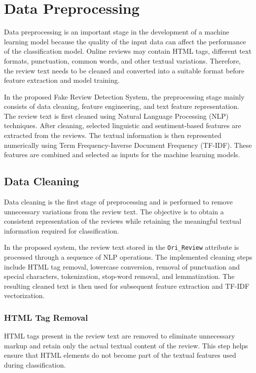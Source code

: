 \documentclass[12pt,a4paper]{report}
\begin{document}
\section{Data Preprocessing}

Data preprocessing is an important stage in the development of a machine learning model because the quality of the input data can affect the performance of the classification model. Online reviews may contain HTML tags, different text formats, punctuation, common words, and other textual variations. Therefore, the review text needs to be cleaned and converted into a suitable format before feature extraction and model training.

In the proposed Fake Review Detection System, the preprocessing stage mainly consists of data cleaning, feature engineering, and text feature representation. The review text is first cleaned using Natural Language Processing (NLP) techniques. After cleaning, selected linguistic and sentiment-based features are extracted from the reviews. The textual information is then represented numerically using Term Frequency-Inverse Document Frequency (TF-IDF). These features are combined and selected as inputs for the machine learning models.

\subsection{Data Cleaning}

Data cleaning is the first stage of preprocessing and is performed to remove unnecessary variations from the review text. The objective is to obtain a consistent representation of the reviews while retaining the meaningful textual information required for classification.

In the proposed system, the review text stored in the \texttt{Ori\_Review} attribute is processed through a sequence of NLP operations. The implemented cleaning steps include HTML tag removal, lowercase conversion, removal of punctuation and special characters, tokenization, stop-word removal, and lemmatization. The resulting cleaned text is then used for subsequent feature extraction and TF-IDF vectorization.

\subsubsection*{HTML Tag Removal}

HTML tags present in the review text are removed to eliminate unnecessary markup and retain only the actual textual content of the review. This step helps ensure that HTML elements do not become part of the textual features used during classification.
\end{document}
